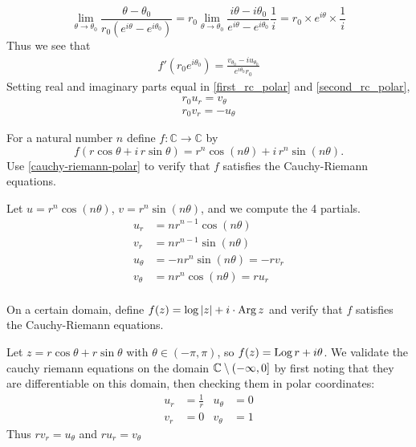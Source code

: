 \documentclass{homework}
\begin{document}
\begin{solution}
\[\lim_{\theta \to \theta_0} \frac{\theta - \theta_0}{r_0(e^{i\theta} - e^{i\theta_0})} = r_0\lim_{\theta \to \theta_0} \frac{i\theta - i\theta_0}{e^{i\theta} - e^{i\theta_0}}\frac{1}{i} = r_0\times e^{i\theta}\times\frac{1}{i}
\]
Thus we see that
\begin{align}\label{second_rc_polar}
f'(r_0e^{i\theta_0}) = \frac{v_{\theta_0} - iu_{\theta_0}}{e^{i\theta_0}r_0}
\end{align}
Setting real and imaginary parts equal in \ref{first_rc_polar} and \ref{second_rc_polar},
\begin{align*}
r_0u_r = v_\theta \\
r_0v_r = - u_\theta
\end{align*}
\end{solution}
\begin{problem}
  For a natural number $n$ define $f : \mathbb{C} \to \mathbb{C}$ by
  \[
    f(r \cos \theta + i \, r\sin \theta) = r^n \cos \left( n\theta \right) + i \, r^n \sin \left( n\theta \right).
  \]
  Use \ref{cauchy-riemann-polar} to verify that $f$ satisfies the
  Cauchy-Riemann equations.
\end{problem}
\begin{solution}
Let $u=r^n\cos(n\theta)$, $v = r^n\sin(n\theta)$, and we compute the 4 partials.
\begin{align*}
u_r &= nr^{n-1}\cos(n\theta)\\
v_r &= nr^{n-1}\sin(n\theta)\\
u_\theta &= -nr^{n}\sin(n\theta) = -rv_r\\
v_\theta &= nr^{n}\cos(n\theta) = ru_r\\
\end{align*}
\end{solution}


\begin{problem}
  On a certain domain, define $f(z) = \log \left|z\right| + i \cdot \operatorname{Arg} z$
  and verify that $f$ satisfies the Cauchy-Riemann equations.
\end{problem}
\begin{solution}
Let $z=r\cos{\theta} + r\sin{\theta}$ with $\theta \in (-\pi, \pi)$, so $f(z) = \operatorname{Log} r + i \theta$. We validate the cauchy riemann equations on the domain $\mathbb{C}\setminus(-\infty, 0]$ by first noting that they are differentiable on this domain, then checking them in polar coordinates:
\begin{align*}
u_r &= \frac{1}{r} &  u_\theta &= 0\\
v_r &= 0 & v_\theta &= 1
\end{align*}
Thus $rv_r = u_\theta$ and $ru_r = v_\theta$
\end{solution}
\end{document}
